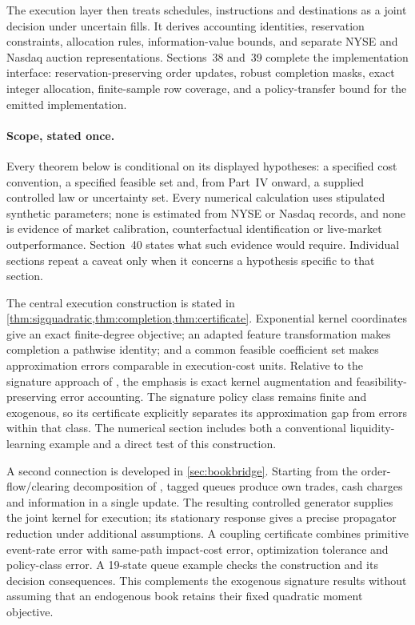 \documentclass[11pt]{article}
\numberwithin{equation}{section}
\theoremstyle{definition}
\theoremstyle{remark}
\theoremstyle{definition}
\begin{document}
The execution layer then treats schedules, instructions and destinations as a
joint decision under uncertain fills. It derives accounting identities,
reservation constraints, allocation rules, information-value bounds, and separate
NYSE and Nasdaq auction representations. Sections~38 and~39 complete the implementation interface: reservation-preserving
order updates, robust completion masks, exact integer allocation, finite-sample
row coverage, and a policy-transfer bound for the emitted implementation.

\paragraph{Scope, stated once.}
Every theorem below is conditional on its displayed hypotheses: a specified
cost convention, a specified feasible set and, from Part~IV onward, a supplied
controlled law or uncertainty set. Every numerical calculation uses stipulated
synthetic parameters; none is estimated from NYSE or Nasdaq records, and none
is evidence of market calibration, counterfactual identification or
live-market outperformance. Section~40 states what such evidence would
require. Individual sections repeat a caveat only when it concerns a
hypothesis specific to that section.

The central execution construction is stated in
\cref{thm:sigquadratic,thm:completion,thm:certificate}. Exponential kernel
coordinates give an exact finite-degree objective; an adapted feature
transformation makes completion a pathwise identity; and a common feasible
coefficient set makes approximation errors comparable in execution-cost
units. Relative to the signature approach of \citet{kalsi2020}, the emphasis
is exact kernel augmentation and feasibility-preserving error accounting.
The signature policy class remains finite and exogenous, so its certificate explicitly
separates its approximation gap from errors within that class. The numerical
section includes both a conventional liquidity-learning example and a direct
test of this construction.

A second connection is developed in \cref{sec:bookbridge}. Starting from the
order-flow/clearing decomposition of \citet{contdegondxuan2025}, tagged
queues produce own trades, cash charges and information in a single update.
The resulting controlled generator supplies the joint kernel for execution;
its stationary response gives a precise propagator reduction under additional
assumptions. A coupling certificate combines primitive event-rate error with
same-path impact-cost error, optimization tolerance and policy-class error.
A 19-state queue example checks the construction and its decision consequences.
This complements the exogenous signature results without assuming that an
endogenous book retains their fixed quadratic moment objective.
\end{document}
